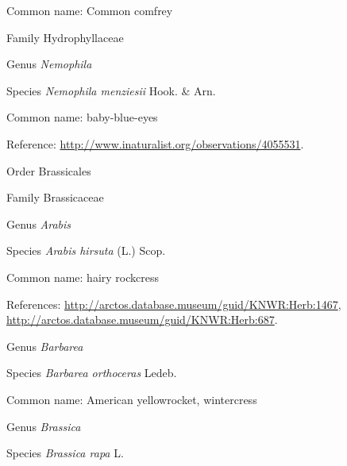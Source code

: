 \documentclass[9pt, article]{memoir}
\begin{document}
\begin{multicols}{2}
Common name: Common comfrey

\vspace{6pt}\noindent\hspace{24pt}Family Hydrophyllaceae


\vspace{6pt}\noindent\hspace{30pt}Genus \textit{Nemophila}


\vspace{6pt}\noindent\hspace{36pt}Species \textit{Nemophila menziesii} Hook. \& Arn.


Common name: baby-blue-eyes

Reference: 
\url{http://www.inaturalist.org/observations/4055531}.

\vspace{6pt}\noindent\hspace{18pt}Order Brassicales


\vspace{6pt}\noindent\hspace{24pt}Family Brassicaceae


\vspace{6pt}\noindent\hspace{30pt}Genus \textit{Arabis}


\vspace{6pt}\noindent\hspace{36pt}Species \textit{Arabis hirsuta} (L.) Scop.


Common name: hairy rockcress

References: 
\url{http://arctos.database.museum/guid/KNWR:Herb:1467}, 
\url{http://arctos.database.museum/guid/KNWR:Herb:687}.

\vspace{6pt}\noindent\hspace{30pt}Genus \textit{Barbarea}


\vspace{6pt}\noindent\hspace{36pt}Species \textit{Barbarea orthoceras} Ledeb.


Common name: American yellowrocket, wintercress

\vspace{6pt}\noindent\hspace{30pt}Genus \textit{Brassica}


\vspace{6pt}\noindent\hspace{36pt}Species \textit{Brassica rapa} L.



\end{multicols}
\end{document}
